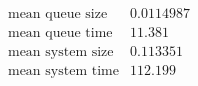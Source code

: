\[\begin{array}{cc}
 \text{mean queue size} & 0.0114987 \\
 \text{mean queue time} & 11.381 \\
 \text{mean system size} & 0.113351 \\
 \text{mean system time} & 112.199 \\
\end{array}\]

